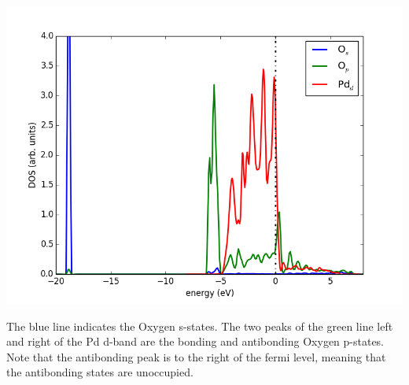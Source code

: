 \documentclass[11pt]{article}
\begin{document}
\includegraphics[width=.9\linewidth]{./images/adsorbate-dos.png}

The blue line indicates the Oxygen s-states. The two peaks of the green line left and right of the Pd d-band are the bonding and antibonding Oxygen p-states. Note that the antibonding peak is to the right of the fermi level, meaning that the antibonding states are unoccupied.
\end{document}
